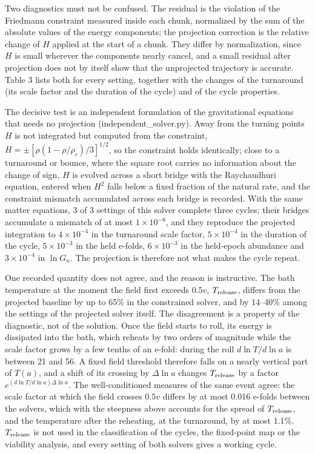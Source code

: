 \documentclass[pdflatex,sn-mathphys-num]{sn-jnl}
\begin{document}
Two diagnostics must not be confused. The residual is the violation of the Friedmann constraint measured inside each chunk, normalized by the sum of the absolute values of the energy components; the projection correction is the relative change of $H$ applied at the start of a chunk. They differ by normalization, since $H$ is small wherever the components nearly cancel, and a small residual after projection does not by itself show that the unprojected trajectory is accurate. Table 3 lists both for every setting, together with the changes of the turnaround (its scale factor and the duration of the cycle) and of the cycle properties.

The decisive test is an independent formulation of the gravitational equations that needs no projection (independent\_solver.py). Away from the turning points $H$ is not integrated but computed from the constraint, $H=\pm[\rho(1-\rho/\rho_c)/3]^{1/2}$, so the constraint holds identically; close to a turnaround or bounce, where the square root carries no information about the change of sign, $H$ is evolved across a short bridge with the Raychaudhuri equation, entered when $H^2$ falls below a fixed fraction of the natural rate, and the constraint mismatch accumulated across each bridge is recorded. With the same matter equations, 3 of 3 settings of this solver complete three cycles; their bridges accumulate a mismatch of at most $1\times10^{-6}$, and they reproduce the projected integration to $4\times10^{-4}$ in the turnaround scale factor, $5\times10^{-4}$ in the duration of the cycle, $5\times10^{-3}$ in the held e-folds, $6\times10^{-3}$ in the held-epoch abundance and $3\times10^{-4}$ in $\ln G_n$. The projection is therefore not what makes the cycle repeat.

One recorded quantity does not agree, and the reason is instructive. The bath temperature at the moment the field first exceeds $0.5v$, $T_{\rm release}$, differs from the projected baseline by up to 65\% in the constrained solver, and by 14--40\% among the settings of the projected solver itself. The disagreement is a property of the diagnostic, not of the solution. Once the field starts to roll, its energy is dissipated into the bath, which reheats by two orders of magnitude while the scale factor grows by a few tenths of an e-fold: during the roll $d\ln T/d\ln a$ is between 21 and 56. A fixed field threshold therefore falls on a nearly vertical part of $T(a)$, and a shift of its crossing by $\Delta\ln a$ changes $T_{\rm release}$ by a factor $e^{(d\ln T/d\ln a)\Delta\ln a}$. The well-conditioned measures of the same event agree: the scale factor at which the field crosses $0.5v$ differs by at most 0.016 e-folds between the solvers, which with the steepness above accounts for the spread of $T_{\rm release}$, and the temperature after the reheating, at the turnaround, by at most 1.1\%. $T_{\rm release}$ is not used in the classification of the cycles, the fixed-point map or the viability analysis, and every setting of both solvers gives a working cycle.
\end{document}
